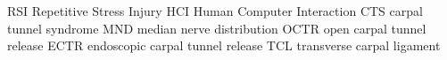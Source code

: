	{RSI}	{Repetitive Stress Injury}
	{HCI}	{Human Computer Interaction}
   {CTS}   {carpal tunnel syndrome}
   {MND}   {median nerve distribution}
  {OCTR}  {open carpal tunnel release}
  {ECTR}  {endoscopic carpal tunnel release}
   {TCL}   {transverse carpal ligament}
